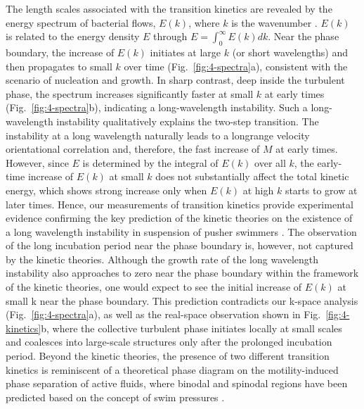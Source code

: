 The length scales associated with the transition kinetics are revealed by the energy spectrum of bacterial flows, $E(k)$, where $k$ is the wavenumber \cite{Wensink2012}. $E(k)$ is related to the energy density $E$ through $E=\int_0^\infty E(k)dk$. Near the phase boundary, the increase of $E(k)$ initiates at large $k$ (or short wavelengths) and then propagates to small $k$ over time (Fig.~\ref{fig:4-spectra}a), consistent with the scenario of nucleation and growth. In sharp contrast, deep inside the turbulent phase, the spectrum increases significantly faster at small $k$ at early times (Fig.~\ref{fig:4-spectra}b), indicating a long-wavelength instability. Such a long-wavelength instability qualitatively explains the two-step transition. The instability at a long wavelength naturally leads to a longrange velocity orientational correlation and, therefore, the fast increase of $M$ at early times.
However, since $E$ is determined by the integral of $E(k)$ over all $k$, the early-time increase of $E(k)$ at small $k$ does not substantially affect the total kinetic energy, which shows strong increase only when $E(k)$ at high $k$ starts to grow at later times.
Hence, our measurements of transition kinetics provide experimental evidence confirming the key prediction of the kinetic theories on the existence of a long wavelength instability in suspension of pusher swimmers \cite{Saintillan2008a, Saintillan2008b, Hohenegger2010, Saintillan2012}.
The observation of the long incubation period near the phase boundary is, however, not captured by the kinetic theories. Although the growth rate of the long wavelength instability also approaches to zero near the phase boundary within the framework of the kinetic theories, one would expect to see the initial increase of $E(k)$ at small k near the phase boundary. This prediction contradicts our k-space analysis (Fig.~\ref{fig:4-spectra}a), as well as the real-space observation shown in Fig.~\ref{fig:4-kinetics}b, where the collective turbulent phase initiates locally at small scales and coalesces into large-scale structures only after the prolonged incubation period. Beyond the kinetic theories, the presence of two different transition kinetics is reminiscent of a theoretical phase diagram on the motility-induced phase separation of active fluids, where binodal and spinodal regions have been predicted based on the concept of swim pressures \cite{Takatori2015}.



